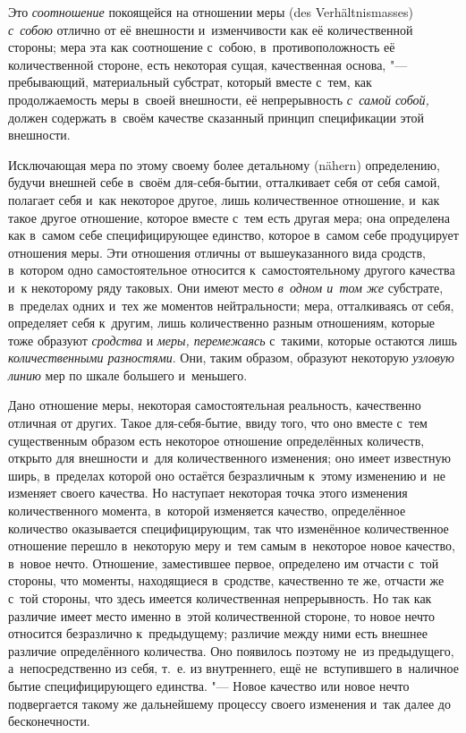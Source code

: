 Это {\em соотношение} покоящейся на отношении меры (des Ver\-hält\-nis\-masses)
{\em с~собою} отлично от её внешности и~изменчивости как её количественной
стороны; мера эта как соотношение с~собою, в~противоположность её
количественной стороне, есть некоторая сущая, качественная основа, "---
пребывающий, материальный субстрат, который вместе с~тем, как продолжаемость
меры в~своей внешности, её непрерывность {\em с~самой собой,} должен содержать
в~своём качестве сказанный принцип спецификации этой внешности.

Исключающая мера по этому своему более детальному (nähern) определению, будучи
внешней себе в~своём для-себя-бытии, отталкивает себя от себя самой, полагает
себя и~как некоторое другое, лишь количественное отношение, и~как такое другое
отношение, которое вместе с~тем есть другая мера; она определена как в~самом
себе специфицирующее единство, которое в~самом себе продуцирует отношения меры.
Эти отношения отличны от вышеуказанного вида сродств, в~котором одно
самостоятельное относится к~самостоятельному другого качества и~к некоторому
ряду таковых. Они имеют место {\em в~одном и~том же} субстрате, в~пределах
одних и~тех же моментов нейтральности; мера, отталкиваясь от себя, определяет
себя к~другим, лишь количественно разным отношениям, которые тоже образуют
{\em сродства} и {\em меры, перемежаясь} с~такими, которые остаются лишь
{\em количественными разностями}. Они, таким образом, образуют некоторую
{\em узловую линию} мер по шкале большего и~меньшего.

Дано отношение меры, некоторая самостоятельная реальность, качественно отличная
от других. Такое для-себя-бытие, ввиду того, что оно вместе с~тем существенным
образом есть некоторое отношение определённых количеств, открыто для внешности
и~для количественного изменения; оно имеет известную ширь, в~пределах которой
оно остаётся безразличным к~этому изменению и~не изменяет своего качества. Но
наступает некоторая точка этого изменения количественного момента, в~которой
изменяется качество, определённое количество оказывается специфицирующим, так
что изменённое количественное отношение перешло в~некоторую меру и~тем самым
в~некоторое новое качество, в~новое нечто. Отношение, заместившее первое,
определено им отчасти с~той стороны, что моменты, находящиеся в~сродстве,
качественно те же, отчасти же с~той стороны, что здесь имеется количественная
непрерывность. Но так как различие имеет место именно в~этой количественной
стороне, то новое нечто относится безразлично к~предыдущему; различие между
ними есть внешнее различие определённого количества. Оно появилось поэтому
не~из предыдущего, а~непосредственно из себя, т.~е. из внутреннего, ещё
не~вступившего в~наличное бытие специфицирующего единства. "--- Новое качество
или новое нечто подвергается такому же дальнейшему процессу своего изменения
и~так далее до бесконечности.

